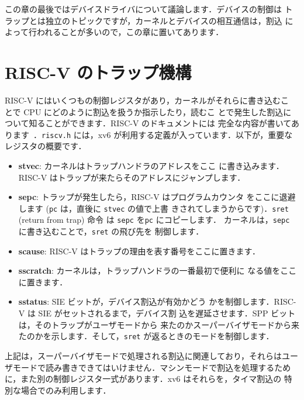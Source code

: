 この章の最後ではデバイスドライバについて議論します．デバイスの制御は
トラップとは独立のトピックですが，カーネルとデバイスの相互通信は，割込
によって行われることが多いので，この章に置いてあります．

\section{RISC-V のトラップ機構}

RISC-V にはいくつもの制御レジスタがあり，カーネルがそれらに書き込むこ
とで CPU にどのように割込を扱うか指示したり，読むこ
とで発生した割込について知ることができます．RISC-V のドキュメントには
完全な内容が書いてあります~\cite{riscv:priv}．\texttt{riscv.h} 
には，xv6 が利用する定義が入っています．以下が，重要なレジスタの概要です．


\begin{itemize}

\item {\bf stvec}: カーネルはトラップハンドラのアドレスをここ
  に書き込みます．RISC-V はトラップが来たらそのアドレスにジャンプします．

\item {\bf sepc}: トラップが発生したら，RISC-V はプログラムカウンタ
  をここに退避します (\texttt{pc} は，直後に \texttt{stvec} の値で上書
  きされてしまうからです)．\texttt{sret} (return from trap) 命令
  は \texttt{sepc} を\texttt{pc} にコピーします．
  カーネルは，\texttt{sepc} に書き込むことで，\texttt{sret} の飛び先を
  制御します．

\item {\bf scause}: RISC-V はトラップの理由を表す番号をここに置きます．

\item {\bf sscratch}: カーネルは，トラップハンドラの一番最初で便利に
  なる値をここに置きます．

\item {\bf sstatus}: SIE ビットが，デバイス割込が有効かどう
  かを制御します．RISC-V は SIE がセットされるまで，デバイス割
  込を遅延させます．SPP ビットは，そのトラップがユーザモードから
  来たのかスーパーバイザモードから来たのかを示します．そして，\texttt{sret} 
  が返るときのモードを制御します．

\end{itemize}

上記は，スーパーバイザモードで処理される割込に関連しており，それらはユー
ザモードで読み書きできてはいけません．マシンモードで割込を処理するため
に，また別の制御レジスタ一式があります．xv6 はそれらを，タイマ割込の
特別な場合でのみ利用します．

